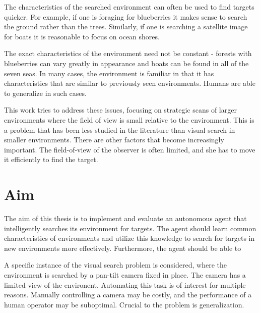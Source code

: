 The characteristics of the searched environment can often be used to find targets quicker. For example, if one is foraging for blueberries it makes sense to search the ground rather than the trees. Similarly, if one is searching a satellite image for boats it is reasonable to focus on ocean shores.

The exact characteristics of the environment need not be constant - forests with blueberries can vary greatly in appearance and boats can be found in all of the seven seas. In many cases, the environment is familiar in that it has characteristics that are similar to previously seen environments. Humans are able to generalize in such cases.



This work tries to address these issues, focusing on strategic scans of larger environments where the field of view is small relative to the environment. This is a problem that has been less studied in the literature than visual search in smaller environments. There are other factors that become increasingly important. The field-of-view of the observer is often limited, and she has to move it efficiently to find the target.



\section{Aim}
\label{sec:aim}

The aim of this thesis is to implement and evaluate an autonomous agent that intelligently searches its environment for targets. The agent should learn common characteristics of environments and utilize this knowledge to search for targets in new environments more effectively. Furthermore, the agent should be able to 

A specific instance of the visual search problem is considered, where the environment is searched by a pan-tilt camera fixed in place. The camera has a limited view of the environent. Automating this task is of interest for multiple reasons. Manually controlling a camera may be costly, and the performance of a human operator may be suboptimal. Crucial to the problem is generalization.

